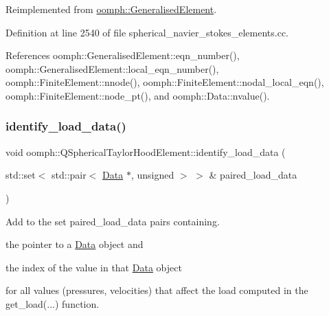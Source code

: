 Reimplemented from \hyperlink{classoomph_1_1GeneralisedElement_a069f59bfc3e607a5bebba52c6314d777}{oomph\+::\+Generalised\+Element}.



Definition at line 2540 of file spherical\+\_\+navier\+\_\+stokes\+\_\+elements.\+cc.



References oomph\+::\+Generalised\+Element\+::eqn\+\_\+number(), oomph\+::\+Generalised\+Element\+::local\+\_\+eqn\+\_\+number(), oomph\+::\+Finite\+Element\+::nnode(), oomph\+::\+Finite\+Element\+::nodal\+\_\+local\+\_\+eqn(), oomph\+::\+Finite\+Element\+::node\+\_\+pt(), and oomph\+::\+Data\+::nvalue().

\mbox{\label{classoomph_1_1QSphericalTaylorHoodElement_a3f964db0b1ca6e1edd0c2b450b79af6d}} 
\subsubsection{\texorpdfstring{identify\+\_\+load\+\_\+data()}{identify\_load\_data()}}
{\footnotesize\ttfamily void oomph\+::\+Q\+Spherical\+Taylor\+Hood\+Element\+::identify\+\_\+load\+\_\+data (\begin{DoxyParamCaption}\item[{std\+::set$<$ std\+::pair$<$ \hyperlink{classoomph_1_1Data}{Data} $\ast$, unsigned $>$ $>$ \&}]{paired\+\_\+load\+\_\+data }\end{DoxyParamCaption})\hspace{0.3cm}{\ttfamily [virtual]}}



Add to the set {\ttfamily paired\+\_\+load\+\_\+data} pairs containing. 


\begin{DoxyItemize}
\item the pointer to a \hyperlink{classoomph_1_1Data}{Data} object and
\item the index of the value in that \hyperlink{classoomph_1_1Data}{Data} object
\end{DoxyItemize}for all values (pressures, velocities) that affect the load computed in the {\ttfamily get\+\_\+load}(...) function.

